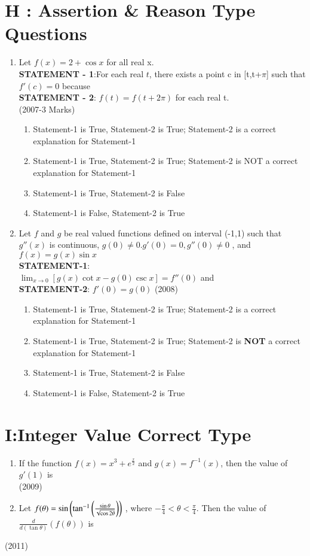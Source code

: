 \documentclass[journal,,12pt,twocolumn]{IEEEtran}
\theoremstyle{remark}
\begin{document}
\section*{H : Assertion \& Reason Type Questions}
\begin{enumerate}
    \item Let $f(x)=2 + \cos{x}$ for all real x.\\
    \textbf{STATEMENT - 1}:For each real $t$, there exists a point c in [t,t+$\pi$] such that $f'(c)=0$ because \\
    \textbf{STATEMENT - 2}: $f(t)=f(t+2\pi)$ for each real t.\\
    \hfill{(2007-3 Marks)}
    \begin{enumerate}[label=(\alph*)]
        \item Statement-1 is True, Statement-2 is True; Statement-2 is a correct explanation for Statement-1
        \item Statement-1 is True, Statement-2 is True; Statement-2 is NOT a correct explanation for Statement-1
        \item Statement-1 is True, Statement-2 is False 
        \item Statement-1 is False, Statement-2 is True
    \end{enumerate}
\item Let $f$ and $g$ be real valued functions defined on interval (-1,1) such that $g''(x)$ is continuous, $g(0)\neq0$.$g'(0)=0, g''(0)\neq0$ , and $f(x)=g(x)\sin{x}$\\
\textbf{STATEMENT-1}:\\
$\lim _{x \to 0}[g(x)\cot{x}-g(0)\csc{x}]=f''(0)$ and\\
\textbf{STATEMENT-2}: $f'(0)=g(0)$
\hfill{(2008)}
\begin{enumerate}[label=(\alph*)]
        \item Statement-1 is True, Statement-2 is True; Statement-2 is a correct explanation for Statement-1
        \item Statement-1 is True, Statement-2 is True; Statement-2 is \textbf{NOT} a correct explanation for Statement-1
        \item Statement-1 is True, Statement-2 is False 
        \item Statement-1 is False, Statement-2 is True
    \end{enumerate}
\end{enumerate}
\section*{I:Integer Value Correct Type}
\begin{enumerate}
    \item If the function $f(x)=x^3+e^{\frac{x}{2}}$ and $g(x)=f^{-1}(x)$, then the value of $g'(1)$ is \\
    \hfill{(2009)}\\
    \item    Let $f(\theta)=\sin{\ensuremath{\left(\tan^{-1}{\left(\frac{\sin{\theta}}{\sqrt{\cos{2\theta}}}\right)}\right)}}$ , where $-\frac{\pi}{4}<\theta<\frac{\pi}{4}$. Then the value of $\frac{d}{d(\tan{\theta})}(f(\theta))$ is
\end{enumerate}  
\hfill{(2011)}
\end{document}
